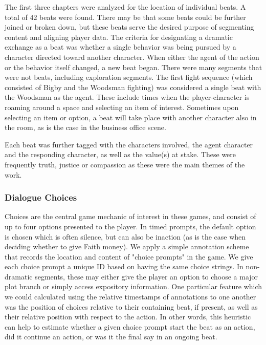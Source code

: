 The first three chapters were analyzed for the location of individual
beats. A total of 42 beats were found. There may be that some beats
could be further joined or broken down, but these beats serve the
desired purpose of segmenting content and aligning player data. The
criteria for designating a dramatic exchange as a beat was whether a
single behavior was being pursued by a character directed toward
another character. When either the agent of the action or the behavior
itself changed, a new beat began. There were many segments that were
not beats, including exploration segments. The first fight sequence
(which consisted of Bigby and the Woodsman fighting) was considered a
single beat with the Woodsman as the agent. These include times when
the player-character is roaming around a space and selecting an item
of interest. Sometimes upon selecting an item or option, a beat will
take place with another character also in the room, as is the case in
the business office scene.

Each beat was further tagged with the characters involved, the agent
character and the responding character, as well as the value(s) at
stake. These were frequently truth, justice or compassion as these
were the main themes of the work.
\subsubsection{Dialogue Choices}
\label{sec:org03fbc70}
Choices are the central game mechanic of interest in these games, and
consist of up to four options presented to the player. In timed
prompts, the default option is chosen which is often silence, but can
also be inaction (as is the case when deciding whether to give Faith
money). We apply a simple annotation scheme that records the location
and content of "choice prompts" in the game. We give each choice
prompt a unique ID based on having the same choice strings. In
non-dramatic segments, these may either give the player an option to
choose a major plot branch or simply access expository
information. One particular feature which we could calculated using
the relative timestamps of annotations to one another was the position
of choices relative to their containing beat, if present, as well as
their relative position with respect to the action. In other words,
this heuristic can help to estimate whether a given choice prompt
start the beat as an action, did it continue an action, or was it the
final say in an ongoing beat.

